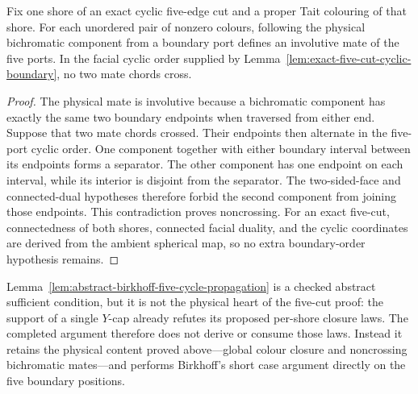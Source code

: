 \begin{lemma}
\label{lem:exact-five-cut-physical-noncrossing}
Fix one shore of an exact cyclic five-edge cut and a proper Tait colouring of
that shore.  For each unordered pair of nonzero colours, following the
physical bichromatic component from a boundary port defines an involutive
mate of the five ports.  In the facial cyclic order supplied by
Lemma~\ref{lem:exact-five-cut-cyclic-boundary}, no two mate chords cross.
\end{lemma}

\begin{proof}
The physical mate is involutive because a bichromatic component has exactly
the same two boundary endpoints when traversed from either end.  Suppose that
two mate chords crossed.  Their endpoints then alternate in the five-port
cyclic order.  One component together with either boundary interval between
its endpoints forms a separator.  The other component has one endpoint on
each interval, while its interior is disjoint from the separator.  The
two-sided-face and connected-dual hypotheses therefore forbid the second
component from joining those endpoints.  This contradiction proves
noncrossing.  For an exact five-cut, connectedness of both shores, connected
facial duality, and the cyclic coordinates are derived from the ambient
spherical map, so no extra boundary-order hypothesis remains.
\end{proof}

Lemma~\ref{lem:abstract-birkhoff-five-cycle-propagation} is a checked abstract
sufficient condition, but it is not the physical heart of the five-cut proof:
the support of a single $Y$-cap already refutes its proposed per-shore closure
laws.  The completed argument therefore does not derive or consume those laws.
Instead it retains the physical content proved above---global colour closure
and noncrossing bichromatic mates---and performs Birkhoff's short case argument
directly on the five boundary positions.

